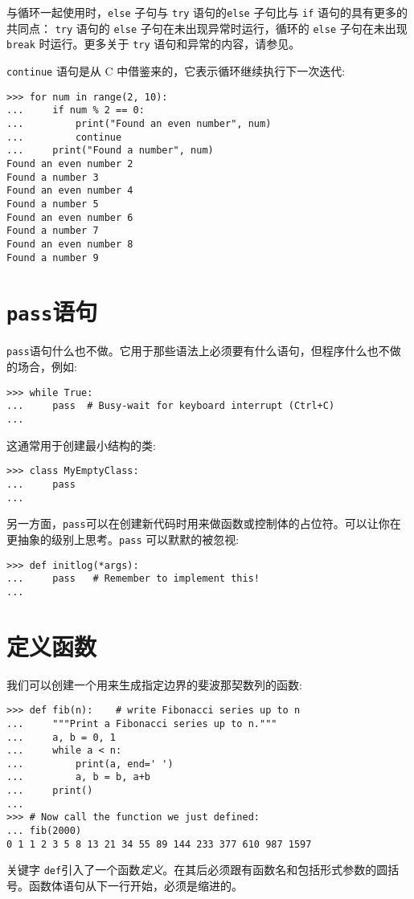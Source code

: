 与循环一起使用时，\texttt{else} 子句与 \texttt{try} 语句的\texttt{else} 子句比与 \texttt{if} 语句的具有更多的共同点： \texttt{try} 语句的 \texttt{else} 子句在未出现异常时运行，循环的 \texttt{else} 子句在未出现 \texttt{break} 时运行。更多关于 \texttt{try} 语句和异常的内容，请参见。

\texttt{continue} 语句是从 C 中借鉴来的，它表示循环继续执行下一次迭代:
\begin{lstlisting}
>>> for num in range(2, 10):
...     if num % 2 == 0:
...         print("Found an even number", num)
...         continue
...     print("Found a number", num)
Found an even number 2
Found a number 3
Found an even number 4
Found a number 5
Found an even number 6
Found a number 7
Found an even number 8
Found a number 9
\end{lstlisting}
\section{\texttt{pass}语句}
\texttt{pass}语句什么也不做。它用于那些语法上必须要有什么语句，但程序什么也不做的场合，例如:
\begin{lstlisting}
>>> while True:
...     pass  # Busy-wait for keyboard interrupt (Ctrl+C)
...
\end{lstlisting}
这通常用于创建最小结构的类:
\begin{lstlisting}
>>> class MyEmptyClass:
...     pass
...
\end{lstlisting}
另一方面，\texttt{pass}可以在创建新代码时用来做函数或控制体的占位符。可以让你在更抽象的级别上思考。\texttt{pass} 可以默默的被忽视:
\begin{lstlisting}
>>> def initlog(*args):
...     pass   # Remember to implement this!
...
\end{lstlisting}
\section{定义函数}
我们可以创建一个用来生成指定边界的斐波那契数列的函数:
\begin{lstlisting}
>>> def fib(n):    # write Fibonacci series up to n
...     """Print a Fibonacci series up to n."""
...     a, b = 0, 1
...     while a < n:
...         print(a, end=' ')
...         a, b = b, a+b
...     print()
...
>>> # Now call the function we just defined:
... fib(2000)
0 1 1 2 3 5 8 13 21 34 55 89 144 233 377 610 987 1597
\end{lstlisting}

关键字 \texttt{def}引入了一个函数\emph{定义}。在其后必须跟有函数名和包括形式参数的圆括号。函数体语句从下一行开始，必须是缩进的。

